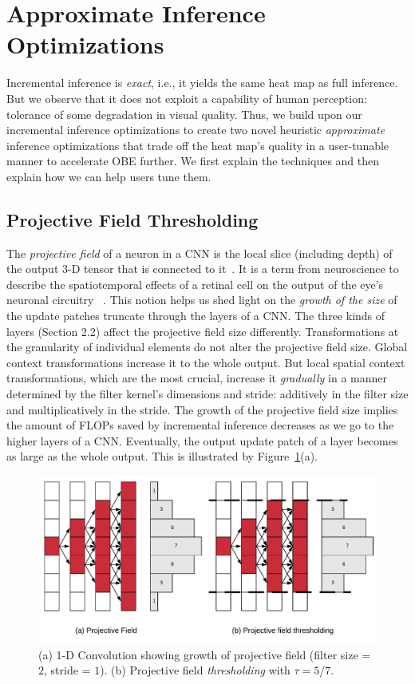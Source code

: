 \section{Approximate Inference Optimizations}\label{sec:approx}
Incremental inference is \textit{exact}, i.e., it yields the same heat map as full inference. But we observe that it does not exploit a capability of human perception: tolerance of some degradation in visual quality. Thus, we build upon our incremental inference optimizations to create two novel heuristic \textit{approximate} inference optimizations that trade off the heat map's quality in a user-tunable manner to accelerate OBE further. We first explain the techniques and then explain how we can help users tune them.

\subsection{Projective Field Thresholding}
The \textit{projective field} of a neuron in a CNN is the local slice (including depth) of the output 3-D tensor that is connected to it~\cite{le2017receptive, basiccnnoperations}. It is a term from neuroscience to describe the spatiotemporal effects of a retinal cell on the output of the eye's neuronal circuitry~ \cite{de2011projective}. This notion helps us shed light on the \textit{growth of the size} of the update patches truncate through the layers of a CNN. The three kinds of layers (Section 2.2) affect the projective field size differently. Transformations at the granularity of individual elements do not alter the projective field size. Global context transformations increase it to the whole output. But local spatial context transformations, which are the most crucial, increase it \textit{gradually} in a manner determined by the filter kernel's dimensions and stride: additively in the filter size and multiplicatively in the stride. The growth of the projective field size implies the amount of FLOPs saved by incremental inference decreases as we go to the higher layers of a CNN. Eventually, the output update patch of a layer becomes as large as the whole output. This is illustrated by Figure~\ref{fig:pf_truncate}(a).

\begin{figure}[t]
\includegraphics[width=\columnwidth]{images/pf_truncate}
\caption{(a) 1-D Convolution showing growth of projective field (filter size = $2$, stride = $1$). (b) Projective field \textit{thresholding} with $\tau = 5/7$.}
\label{fig:pf_truncate}
\end{figure}

